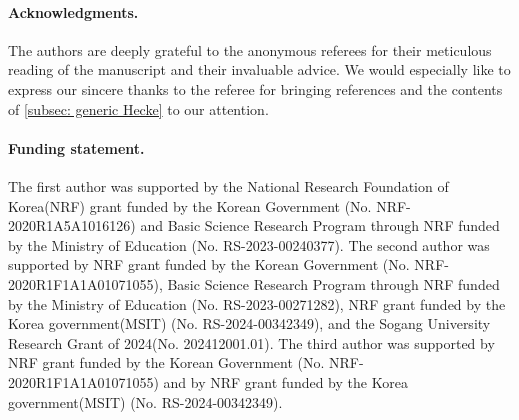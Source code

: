 \documentclass[12pt, reqno]{amsart}
\theoremstyle{definition}
\numberwithin{equation}{section} \numberwithin{figure}{section}
\numberwithin{table}{section}
\begin{document}
\paragraph{{\bf Acknowledgments.}}
The authors are deeply grateful to the anonymous referees for their meticulous reading of the manuscript and their invaluable advice. We would especially like to express our sincere thanks to the referee for bringing references \cite{84LS, 97LLT} and the contents of \cref{subsec: generic Hecke} to our attention.
\medskip 

\paragraph{{\bf Funding statement.}}
The first author was supported by the National Research Foundation of Korea(NRF) grant funded by the Korean Government (No. NRF-2020R1A5A1016126) and Basic Science Research Program through NRF funded by the Ministry of Education (No. RS-2023-00240377).
The second author was supported by NRF grant funded by the Korean Government (No. NRF-2020R1F1A1A01071055), Basic Science Research Program through NRF funded by the Ministry of Education (No. RS-2023-00271282),  NRF grant funded by the Korea government(MSIT) (No. RS-2024-00342349), and the Sogang University Research Grant of 2024(No. 202412001.01).
The third author was supported by NRF grant funded by the Korean Government (No. NRF-2020R1F1A1A01071055) and by NRF grant funded by the Korea government(MSIT) (No. RS-2024-00342349).
\end{document}
